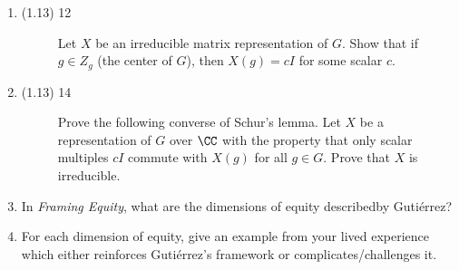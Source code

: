 \documentclass{math174}
\date{Monday, February 20}
\author{}
\begin{document}
\begin{enumerate}
\item
  \begin{description}
  \item[(1.13) 12] Let \(X\) be an irreducible matrix representation
    of \(G\).  Show that if \(g \in Z_g\) (the center of \(G\)), then
    \(X(g) = cI\) for some scalar \(c.\)

    \begin{solution}

    \end{solution}
  \end{description}
\item
  \begin{description}
  \item[(1.13) 14] Prove the following converse of Schur's lemma.  Let
    \(X\) be a representation of \(G\) over \(\CC\) with the property
    that only scalar multiples \(cI\) commute with \(X(g)\) for all
    \(g \in G\).  Prove that \(X\) is irreducible.

    \begin{solution}

    \end{solution}
  \end{description}
\item In \textit{Framing Equity}, what are the dimensions of equity
  describedby Guti\'errez?

  \begin{solution}

  \end{solution}

\item For each dimension of equity, give an example from your lived
  experience which either reinforces Guti\'errez's framework or
  complicates/challenges it.

  \begin{solution}

  \end{solution}
\end{enumerate}
\end{document}

